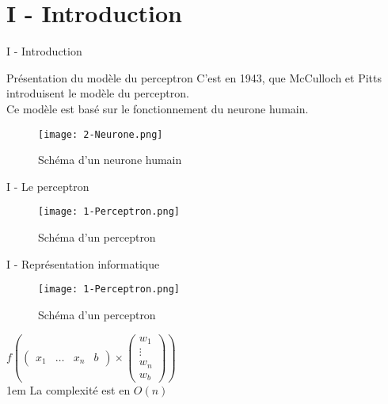 
\section{I - Introduction}
\begin{frame}{I - Introduction}
	\begin{block}{Présentation du modèle du perceptron}
		C'est  en 1943, que McCulloch et Pitts introduisent le modèle du perceptron.  \\
		Ce modèle est basé sur le fonctionnement du neurone humain.
	\end{block}
	\begin{figure}
		\centering
		\texttt{[image: 2-Neurone.png]}
		\caption{Schéma d'un neurone humain}
	\end{figure}
\end{frame}


\begin{frame}{I - Le perceptron}
	\begin{figure}
		\centering
		\texttt{[image: 1-Perceptron.png]}
		\caption{Schéma d'un perceptron}
	\end{figure}
\end{frame}


\begin{frame}{I - Représentation informatique}
	\begin{figure}
		\centering
		\texttt{[image: 1-Perceptron.png]}
		\caption{Schéma d'un perceptron}
	\end{figure}
	\begin{multicols}{2}
		\begin{center}
			$
				f
				\left(
				\begin{pmatrix}
					x_1 & \ldots & x_n & b
				\end{pmatrix}
				\times
				\begin{pmatrix}
					w_1    \\
					\vdots \\
					w_n    \\
					w_b
				\end{pmatrix}
				\right)
			$ \\
			\openup 1em
			La complexité est en $O(n)$
		\end{center}
		\columnbreak
		
	\end{multicols}
\end{frame}